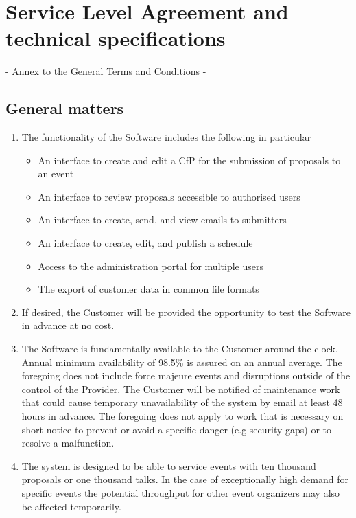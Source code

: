 \documentclass{terms}
\begin{document}
\newpage

\section{Service Level Agreement and technical specifications}
\begin{center}
- Annex to the General Terms and Conditions -
\end{center}

\subsection{General matters}
\begin{enumerate}
\item The functionality of the Software includes the following in particular \begin{itemize}
\item An interface to create and edit a CfP for the submission of proposals to an event
\item An interface to review proposals accessible to authorised users
\item An interface to create, send, and view emails to submitters
\item An interface to create, edit, and publish a schedule
\item Access to the administration portal for multiple users
\item The export of customer data in common file formats
\end{itemize}
\item If desired, the Customer will be provided the opportunity to test the Software in advance at no cost.
\item The Software is fundamentally available to the Customer around the clock.
      Annual minimum availability of 98.5\% is assured on an annual average.
      The foregoing does not include force majeure events and disruptions outside of the control of the Provider.
      The Customer will be notified of maintenance work that could cause temporary unavailability of the system by email at least 48 hours in advance.
      The foregoing does not apply to work that is necessary on short notice to prevent or avoid a specific danger (e.g security gaps) or to resolve a malfunction.
\item The system is designed to be able to service events with ten thousand proposals or one thousand talks.
      In the case of exceptionally high demand for specific events the potential throughput for other event organizers may also be affected temporarily.

\end{enumerate}
\end{document}
